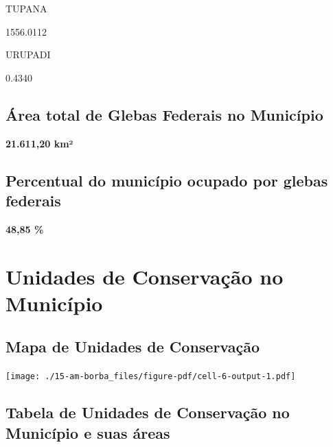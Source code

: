 \documentclass[
  letterpaper,
]{report}
\begin{document}
\n      

TUPANA

\n      

1556.0112

\n    

\n    

\n      

URUPADI

\n      

0.4340

\n    

\n  

\n

\hypertarget{uxe1rea-total-de-glebas-federais-no-municuxedpio-1}{%
\subsection{Área total de Glebas Federais no
Município}\label{uxe1rea-total-de-glebas-federais-no-municuxedpio-1}}

\textbf{21.611,20 km²}

\hypertarget{percentual-do-municuxedpio-ocupado-por-glebas-federais-1}{%
\subsection{Percentual do município ocupado por glebas
federais}\label{percentual-do-municuxedpio-ocupado-por-glebas-federais-1}}

\textbf{48,85 \%}

\hypertarget{unidades-de-conservauxe7uxe3o-no-municuxedpio-1}{%
\section{Unidades de Conservação no
Município}\label{unidades-de-conservauxe7uxe3o-no-municuxedpio-1}}

\hypertarget{mapa-de-unidades-de-conservauxe7uxe3o-1}{%
\subsection{Mapa de Unidades de
Conservação}\label{mapa-de-unidades-de-conservauxe7uxe3o-1}}

\texttt{[image: ./15-am-borba\_files/figure-pdf/cell-6-output-1.pdf]}

\hypertarget{tabela-de-unidades-de-conservauxe7uxe3o-no-municuxedpio-e-suas-uxe1reas-1}{%
\subsection{Tabela de Unidades de Conservação no Município e suas
áreas}\label{tabela-de-unidades-de-conservauxe7uxe3o-no-municuxedpio-e-suas-uxe1reas-1}}
\end{document}
